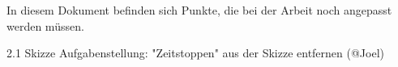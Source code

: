 
In diesem Dokument befinden sich Punkte, die bei der Arbeit noch angepasst werden müssen.

2.1 Skizze Aufgabenstellung:
"Zeitstoppen" aus der Skizze entfernen (@Joel)




